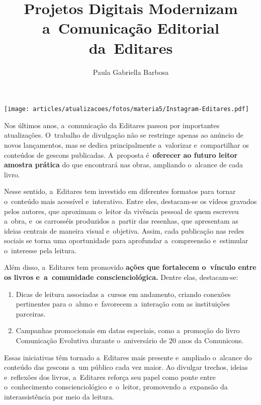 \documentclass{gescons}
\author{Paula Gabriella Barbosa}
\title{Projetos Digitais Modernizam a~Comunicação Editorial da~Editares}
\begin{document}
    \makeentrevistatitle


    
    
\begin{center}
    \texttt{[image: articles/atualizacoes/fotos/materia5/Instagram-Editares.pdf]} 
\end{center}
    
    \begin{multicols}{2}


Nos últimos anos, a~comunicação da Editares passou por importantes atualizações. O~trabalho de divulgação não se restringe apenas ao anúncio de novos lançamentos, mas se dedica principalmente a~valorizar e~compartilhar os conteúdos de gescons publicadas. A~proposta é~\textbf{oferecer ao futuro leitor amostra prática} do que encontrará nas obras, ampliando o~alcance de cada livro.

Nesse sentido, a~Editares tem investido em diferentes formatos para tornar o~conteúdo mais acessível e~interativo. Entre eles, destacam-se os vídeos gravados pelos autores, que aproximam o~leitor da vivência pessoal de quem escreveu a~obra, e~os carrosséis produzidos a~partir das resenhas, que apresentam as ideias centrais de maneira visual e~objetiva. Assim, cada publicação nas redes sociais se torna uma oportunidade para aprofundar a~compreensão e~estimular o~interesse pela leitura.

Além disso, a~Editares tem promovido \textbf{ações que fortalecem o~vínculo entre os livros e~a~comunidade conscienciológica.} Dentre elas, destacam-se:

\begin{enumerate}
\def\labelenumi{\arabic{enumi}.}
\item
  Dicas de leitura associadas a~cursos em andamento, criando conexões pertinentes para o~aluno e~favorecem a~interação com as instituições parceiras.
\item
  Campanhas promocionais em datas especiais, como a~promoção do livro Comunicação Evolutiva durante o~aniversário de 20 anos da Comunicons.
\end{enumerate}

Essas iniciativas têm tornado a~Editares mais presente e~ampliado o~alcance do conteúdo das gescons a~um público cada vez maior. Ao divulgar trechos, ideias e~reflexões dos livros, a~Editares reforça seu papel como ponte entre o~conhecimento conscienciológico e~o~leitor, promovendo a~expansão da interassistência por meio da leitura.






    \end{multicols}
\end{document}
